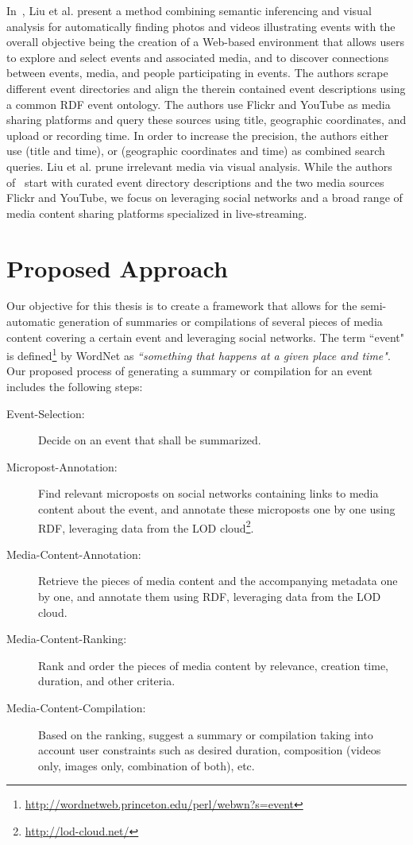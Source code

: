 \documentclass[runningheads,a4paper]{llncs}
\begin{document}
In~\cite{Liu:2011:FMI:1991996.1992054}, Liu et al. present a method combining semantic inferencing and visual analysis for automatically finding photos and videos illustrating events with the overall objective being the creation of a Web-based environment that allows users to explore and select events and associated media, and to discover connections between events, media, and people participating in events. The authors scrape different event directories and align the therein contained event descriptions using a common RDF event ontology. The authors use Flickr and YouTube as media sharing platforms and query these sources using title, geographic coordinates, and upload or recording time. In order to increase the precision, the authors either use (title and time), or (geographic coordinates and time) as combined search queries. Liu et al. prune irrelevant media via visual analysis. While the authors of~\cite{Liu:2011:FMI:1991996.1992054} start with curated event directory descriptions and the two media sources Flickr and YouTube, we focus on leveraging social networks and a broad range of media content sharing platforms specialized in live-streaming.

\section{Proposed Approach}
Our objective for this thesis is to create a framework that allows for the semi-automatic generation of summaries or compilations of several pieces of media content covering a certain event and leveraging social networks. The term ``event" is defined\footnote{\url{http://wordnetweb.princeton.edu/perl/webwn?s=event}} by WordNet as \textit{``something that happens at a given place and time"}. Our proposed process of generating a summary or compilation for an event includes the following steps:

\begin{description}
\item [Event-Selection:] Decide on an event that shall be summarized.
\item [Micropost-Annotation:] Find relevant microposts on social networks containing links to media content about the event, and annotate these microposts one by one using RDF, leveraging data from the LOD cloud\footnote{\url{http://lod-cloud.net/}}.
\item [Media-Content-Annotation:] Retrieve the pieces of media content and the accompanying metadata one by one, and annotate them using RDF, leveraging data from the LOD cloud.
\item [Media-Content-Ranking:] Rank and order the pieces of media content by relevance, creation time, duration, and other criteria.
\item [Media-Content-Compilation:] Based on the ranking, suggest a summary or compilation taking into account user constraints such as desired duration, composition (videos only, images only, combination of both), etc.
\end{description}
\end{document}
